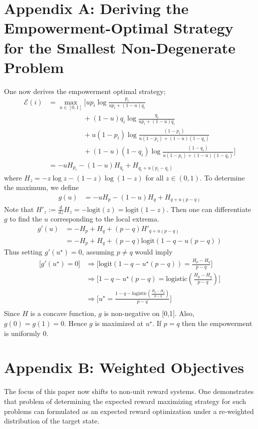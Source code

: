 \documentclass{article}
\newcommand{\Ee}{\mathcal{E}}
\begin{document}
\section*{Appendix A: Deriving the Empowerment-Optimal Strategy for the Smallest Non-Degenerate Problem}
One now derives the empowerment optimal strategy; 
\begin{align*}
\Ee(i) 
	&= \max_{u\in [0,1]}\bigg[up_i \log \frac{p_i}{up_i+(1-u)q_i}\\
	&\hspace{5em} + (1-u)q_i \log \frac{q_i}{up_i+(1-u)q_i}\\
	&\hspace{5em} + u(1-p_i) \log \frac{(1-p_i)}{u(1-p_i)+(1-u)(1-q_i)}\\
	&\hspace{5em} + (1-u)(1-q_i) \log \frac{(1-q_i)}{u(1-p_i)+(1-u)(1-q_i)}\bigg]\\
	&=-uH_{p_i}-(1-u)H_{q_i}+H_{q_i+u(p_i-q_i)}
\end{align*}
where $H_z=-z\log z - (1-z)\log(1-z)$ for all $z\in (0,1)$. To determine the maximum, we define 
\begin{align*}
g(u)&= -uH_{p}-(1-u)H_{q}+H_{q+u(p-q)} 
\end{align*}
Note that $H'_z:=\frac{d}{dz} H_z= -\text{logit}(z)=\text{logit}(1-z)$.
Then one can differentiate $g$ to find the $u$ corresponding to the local extrema.
\begin{align*}
g'(u) 
	&= -H_p + H_q + (p-q)H'_{q+u(p-q)}\\
	&= -H_p + H_q +(p-q)\text{logit}(1-q-u(p-q))
\end{align*}
Thus setting $g'(u^\star)=0$, assuming $p\neq q$ would imply
\begin{align*}
\bigg[g'(u^\star)=0\bigg]
	&\Rightarrow\bigg[\text{logit}(1-q-u^\star(p-q)) = \frac{H_{p}-H_{q}}{p-q}\bigg]\\
	&\Rightarrow\bigg[1-q-u^\star(p-q) = \text{logistic}\left(\frac{H_{p}-H_{q}}{p-q}\right)\bigg]\\
	&\Rightarrow\bigg[u^\star=\frac{1-q-\text{logistic}\left(\frac{H_{p}-H_{q}}{p-q}\right)}{p-q} \bigg]\\
\end{align*}
Since $H$ is a concave function, $g$ is non-negative on [0,1]. Also, $g(0)=g(1)=0$. Hence $g$ is maximized at $u^\star$. If $p=q$ then the empowerment is uniformly $0$.


\section*{Appendix B: Weighted Objectives}
The focus of this paper now shifts to non-unit reward systems. One demonstrates that problem of determining the expected reward maximizing strategy for such problems can formulated as an expected reward optimization under a re-weighted distribution of the target state.\vspace{1em}
\end{document}
